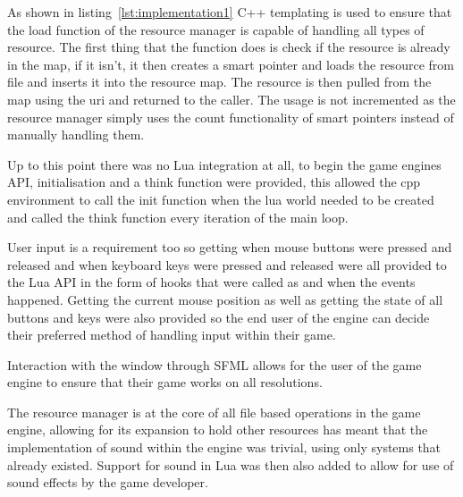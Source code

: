\documentclass[11pt,a4paper,titlepage]{report}
\begin{document}
	

	As shown in listing~\ref{lst:implementation1} C++ templating is used to ensure that the load function of the resource manager is capable of handling all types of resource. The first thing that the function does is check if the resource is already in the map, if it isn't, it then creates a smart pointer and loads the resource from file and inserts it into the resource map. The resource is then pulled from the map using the uri and returned to the caller. The usage is not incremented as the resource manager simply uses the count functionality of smart pointers instead of manually handling them.


    Up to this point there was no Lua integration at all, to begin the game engines API, initialisation and a think function were provided, this allowed the cpp environment to call the init function when the lua world needed to be created and called the think function every iteration of the main loop.

    User input is a requirement too so getting when mouse buttons were pressed and released and when keyboard keys were pressed and released were all provided to the Lua API in the form of hooks that were called as and when the events happened. Getting the current mouse position as well as getting the state of all buttons and keys were also provided so the end user of the engine can decide their preferred method of handling input within their game.


   Interaction with the window through SFML allows for the user of the game engine to ensure that their game works on all resolutions.


    The resource manager is at the core of all file based operations in the game engine, allowing for its expansion to hold other resources has meant that the implementation of sound within the engine was trivial, using only systems that already existed. Support for sound in Lua was then also added to allow for use of sound effects by the game developer.

\end{document}
